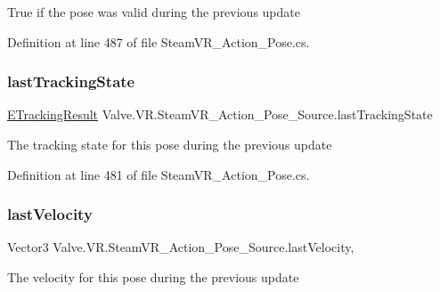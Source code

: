 True if the pose was valid during the previous update 



Definition at line 487 of file Steam\+V\+R\+\_\+\+Action\+\_\+\+Pose.\+cs.

\mbox{\label{class_valve_1_1_v_r_1_1_steam_v_r___action___pose___source_aaceb2ef18d1322c219d3d29c2a74300f}} 
\subsubsection{\texorpdfstring{lastTrackingState}{lastTrackingState}}
{\footnotesize\ttfamily \mbox{\hyperlink{namespace_valve_1_1_v_r_abe6feab98f33191b7c27b4292012e90a}{E\+Tracking\+Result}} Valve.\+V\+R.\+Steam\+V\+R\+\_\+\+Action\+\_\+\+Pose\+\_\+\+Source.\+last\+Tracking\+State\hspace{0.3cm}{\ttfamily [get]}}



The tracking state for this pose during the previous update 



Definition at line 481 of file Steam\+V\+R\+\_\+\+Action\+\_\+\+Pose.\+cs.

\mbox{\label{class_valve_1_1_v_r_1_1_steam_v_r___action___pose___source_a9924e517cd19760a503d0e6e46eec613}} 
\subsubsection{\texorpdfstring{lastVelocity}{lastVelocity}}
{\footnotesize\ttfamily Vector3 Valve.\+V\+R.\+Steam\+V\+R\+\_\+\+Action\+\_\+\+Pose\+\_\+\+Source.\+last\+Velocity\hspace{0.3cm}{\ttfamily [get]}, {}}



The velocity for this pose during the previous update 



